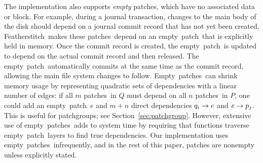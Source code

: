 \documentclass[9pt,twocolumn,letterpaper]{article}
\newcommand{\Kudos}{Featherstitch}
\newcommand{\patch}{patch}
\newcommand{\patches}{patches}
\newcommand{\patchgroups}{patchgroups}
\newcommand{\noop}{empty}
\newcommand{\Noop}{Empty}
\newcommand{\anoop}{an empty}
\newcommand{\aemphnoop}{an \emph{empty}}
\begin{document}
The implementation also supports \emph{\noop} \patches, which have
 no associated data or block.
%
%
For example, during a journal transaction,
 changes to the main body of the disk should depend on a
 journal commit record that has not yet been created.
%
\Kudos\ makes these \patches\ depend on an \noop\ \patch\
 that is explicitly held in memory.
%
Once the commit record is created, the \noop\ \patch\ is updated to depend on
 the actual commit record and then released.
%
The \noop\ \patch\ automatically commits at the same time as the commit
 record, allowing the main file system changes to follow.
%
%
\Noop\ \patches\ can shrink memory usage by representing quadratic sets of
 dependencies with a linear number of edges: if all $m$ \patches\ in $Q$
 must depend on all $n$ \patches\ in $P$, one could
 add an \noop\ \patch\ $e$ and $m+n$ direct dependencies
 $q_i \rightarrow e$ and $e \rightarrow p_j$.
%
This is useful for \patchgroups; see Section~\ref{sec:patchgroup}.
%
However, extensive use of \noop\ \patches\ adds to system time by
 requiring that functions traverse \noop\ \patch\ layers to find true
 dependencies.
%
Our implementation uses \noop\ \patches\ infrequently, and in the
 rest of this paper, patches are nonempty unless explicitly
 stated.


\begin{comment}
To solve this problem, we introduce an additional type of \patch. The
prototypical \patch\ corresponds to some change on disk, but \Kudos\ also
supports \aemphnoop\ \patch\ type, which doesn't change the disk at all.
\Noop\ \patches\ can have \befores, like other \patches, but they don't need to
be written to disk: they are trivially satisfied when all of their \befores\ are
satisfied. Thus, they can be used to ``stand for'' entire sets of other changes.
%
This capability is extremely useful, and is used by most operations on disk
structures so that a single \patch\ can be returned that depends on the whole
change. Likewise, \anoop\ \patch\ can be passed in as a parameter to a disk
operation to make the whole operation depend on a set of other changes. \Noop\
\patches\ allow dependencies between sets with only a linear number of
dependency edges in the \patch\ graph, and without having to pass around arrays
of \patches.
%
The cost is that some functions may have to traverse trees of \noop\ \patches\
to determine true dependencies.
\end{comment}
\end{document}
